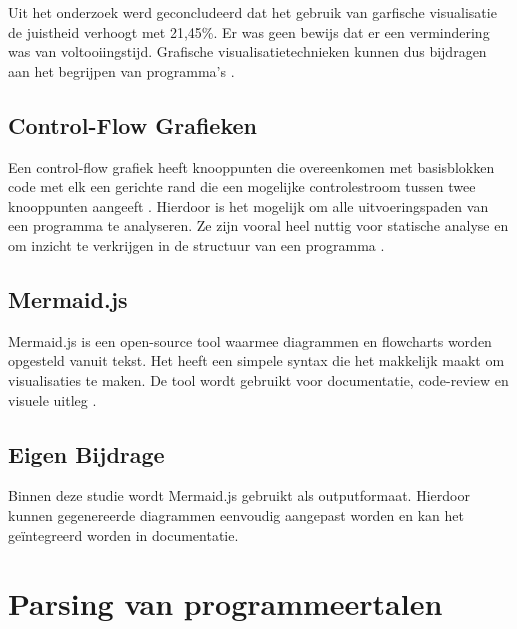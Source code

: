 Uit het onderzoek werd geconcludeerd dat het gebruik van garfische visualisatie de juistheid verhoogt met 21,45\%. Er was geen bewijs dat er een vermindering was van voltooiingstijd. Grafische visualisatietechnieken kunnen dus bijdragen aan het begrijpen van programma's \autocite{cardenas_aponte_2017}.  

\subsection{Control-Flow Grafieken}

Een control-flow grafiek heeft knooppunten die overeenkomen met basisblokken code met elk een gerichte rand die een mogelijke controlestroom tussen twee knooppunten aangeeft \autocite{debbabi_salcic_biglari-abhari_malik}. Hierdoor is het mogelijk om alle uitvoeringspaden van een programma te analyseren. Ze zijn vooral heel nuttig voor statische analyse en om inzicht te verkrijgen in de structuur van een programma \autocite{debbabi_salcic_biglari-abhari_malik}. 


\subsection{Mermaid.js}

Mermaid.js is een open-source tool waarmee diagrammen en flowcharts worden opgesteld vanuit tekst. Het heeft een simpele syntax die het makkelijk maakt om visualisaties te maken. De tool wordt gebruikt voor documentatie, code-review en visuele uitleg \autocite{sveidqvist_jain_2021}. 

\subsection{Eigen Bijdrage}

Binnen deze studie wordt Mermaid.js gebruikt als outputformaat. Hierdoor kunnen gegenereerde diagrammen eenvoudig aangepast worden en kan het geïntegreerd worden in documentatie.

\newpage

\section{Parsing van programmeertalen}

